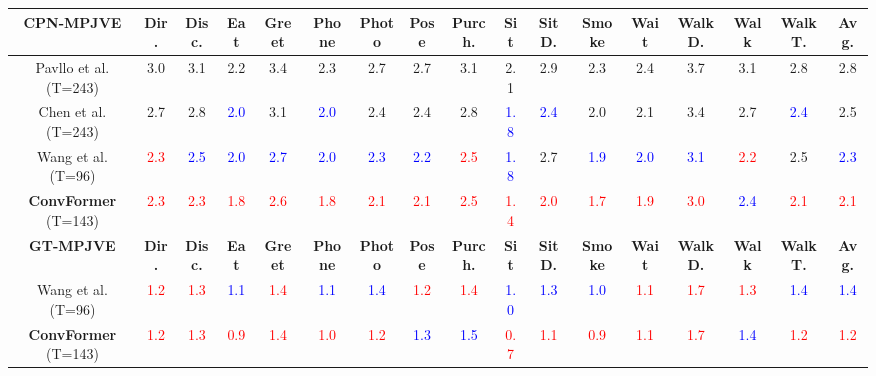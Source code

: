 \documentclass{article}
\begin{document}
\begin{table*}[!htb]
{\begin{tabular}{*{17}{|c}|}
\textbf{CPN-MPJVE} & \textbf{Dir.} & \textbf{Disc.} & \textbf{Eat} & \textbf{Greet} & \textbf{Phone} & \textbf{Photo} & \textbf{Pose}  & \textbf{Purch.} & \textbf{Sit} & \textbf{SitD.} & \textbf{Smoke} & \textbf{Wait} & \textbf{WalkD.} & \textbf{Walk}  & \textbf{WalkT.} & \textbf{Avg.} \\


\hline
 Pavllo et al. \cite{PFGA19} (T=243) & 3.0 & 3.1 & 2.2 & 3.4 & 2.3 &  2.7 &  2.7 &3.1 & 2.1 & 2.9 & 2.3 & 2.4 & 3.7 & 3.1 & 2.8 & 2.8 \\
  Chen et al. \cite{CFSZCL21} (T=243) & 2.7 &  2.8 & \textcolor{blue}{2.0} & 3.1 & \textcolor{blue}{2.0} & 2.4 & 2.4 &  2.8 & \textcolor{blue}{1.8} & \textcolor{blue}{2.4} & 2.0 & 2.1 & 3.4  & 2.7 & \textcolor{blue}{2.4} & 2.5 \\ 
  Wang et al. \cite{WYXL20} (T=96) & \textcolor{red}{2.3} & \textcolor{blue}{2.5} & \textcolor{blue}{2.0} & \textcolor{blue}{2.7} & \textcolor{blue}{2.0} & \textcolor{blue}{2.3} & \textcolor{blue}{2.2} & \textcolor{red}{2.5} & \textcolor{blue}{1.8} & 2.7 & \textcolor{blue}{1.9} & \textcolor{blue}{2.0} & \textcolor{blue}{3.1} & \textcolor{red}{2.2} & 2.5 & \textcolor{blue}{2.3} \\
\hline
\textbf{ConvFormer} (T=143) & \textcolor{red}{2.3} & \textcolor{red}{2.3} & \textcolor{red}{1.8} & \textcolor{red}{2.6} & \textcolor{red}{1.8} & \textcolor{red}{2.1} & \textcolor{red}{2.1} & \textcolor{red}{2.5} & \textcolor{red}{1.4} & \textcolor{red}{2.0} & \textcolor{red}{1.7} & \textcolor{red}{1.9} & \textcolor{red}{3.0} & \textcolor{blue}{2.4} & \textcolor{red}{2.1} & \textcolor{red}{2.1} \\
\hline
\textbf{GT-MPJVE} & \textbf{Dir.} & \textbf{Disc.} & \textbf{Eat} & \textbf{Greet} & \textbf{Phone} & \textbf{Photo} & \textbf{Pose}  & \textbf{Purch.} & \textbf{Sit} & \textbf{SitD.} & \textbf{Smoke} & \textbf{Wait} & \textbf{WalkD.} & \textbf{Walk}  & \textbf{WalkT.} & \textbf{Avg.} \\

\hline
 Wang et al. \cite{WYXL20} (T=96) & \textcolor{red}{1.2} & \textcolor{red}{1.3} & \textcolor{blue}{1.1} & \textcolor{red}{1.4} & \textcolor{blue}{1.1} & \textcolor{blue}{1.4} & \textcolor{red}{1.2} & \textcolor{red}{1.4} & \textcolor{blue}{1.0} & \textcolor{blue}{1.3} & \textcolor{blue}{1.0} & \textcolor{red}{1.1} & \textcolor{red}{1.7} & \textcolor{red}{1.3} & \textcolor{blue}{1.4} & \textcolor{blue}{1.4} \\
\hline
\textbf{ConvFormer} (T=143) &  \textcolor{red}{1.2} & \textcolor{red}{1.3} & \textcolor{red}{0.9} & \textcolor{red}{1.4} & \textcolor{red}{1.0} & \textcolor{red}{1.2} & \textcolor{blue}{1.3} & \textcolor{blue}{1.5} & \textcolor{red}{0.7} & \textcolor{red}{1.1} & \textcolor{red}{0.9} & \textcolor{red}{1.1} & \textcolor{red}{1.7} & \textcolor{blue}{1.4} & \textcolor{red}{1.2} & \textcolor{red}{1.2}\\
\hline
  
\end{tabular}}
\label{Table:GT}

\end{table*}
\end{document}
